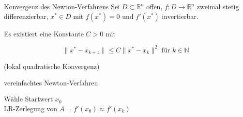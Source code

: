 \begin{flashcard}[Ungleichung]{Konvergenz des Newton-Verfahrens}
	Sei $D \subset \mathbb{R}^n$ offen, $f : D \rightarrow \mathbb{R}^n$ zweimal stetig differenzierbar, $x^* \in D$ mit $f(x^*) = 0$ und $f'(x^*)$ invertierbar.

Es existiert eine Konstante $C > 0$ mit

$$
\|x^* - x_{k+1}\| \leq C \|x^* - x_k\|^2 \text{ für } k \in \mathbb{N}
$$

(lokal quadratische Konvergenz)
\end{flashcard}

\begin{flashcard}[Algorithmus]{vereinfachtes Newton-Verfahren}
\begin{algorithm}[H]
	Wähle Startwert $x_0$\\
	LR-Zerlegung von $A = f'(x_0) \approx f'(x_k)$\\
\end{algorithm}
\end{flashcard}
